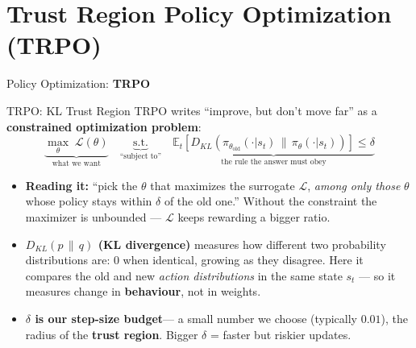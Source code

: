 \section{Trust Region Policy Optimization (TRPO)}
\begin{frame}{}
    \LARGE Policy Optimization: \textbf{TRPO}
\end{frame}

\begin{frame}{TRPO: KL Trust Region}
TRPO writes ``improve, but don't move far'' as a \textbf{constrained optimization problem}:
$$\underbrace{\max_\theta\; \mathcal{L}(\theta)}_{\text{what we want}} \quad \underbrace{\text{s.t.}}_{\text{``subject to''}} \quad \underbrace{\mathbb{E}_t\!\left[ D_{KL}\!\left(\pi_{\theta_\text{old}}(\cdot|s_t) \,\|\, \pi_\theta(\cdot|s_t)\right) \right] \leq \delta}_{\text{the rule the answer must obey}}$$
\vspace{-0.5em}
\begin{itemize}
    \item \textbf{Reading it:} ``pick the $\theta$ that maximizes the surrogate $\mathcal{L}$, \emph{among only those} $\theta$ whose policy stays within $\delta$ of the old one.'' Without the constraint the maximizer is unbounded --- $\mathcal{L}$ keeps rewarding a bigger ratio.
    \item \textbf{$D_{KL}(p \,\|\, q)$ (KL divergence)} measures how different two probability distributions are: $0$ when identical, growing as they disagree. Here it compares the old and new \emph{action distributions} in the same state $s_t$ --- so it measures change in \textbf{behaviour}, not in weights.
    \item \textbf{$\delta$ is our step-size budget}\footnotemark --- a small number we choose (typically $0.01$), the radius of the \textbf{trust region}. Bigger $\delta$ = faster but riskier updates.
\end{itemize}
\end{frame}

